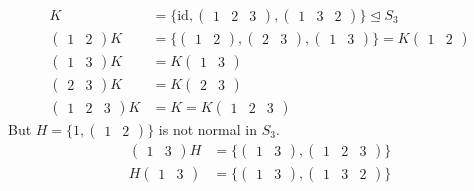 \begin{example} ~\vspace*{-1.5\baselineskip}
\begin{align*}
    K &= \{ \text{id}, \begin{pmatrix}1 & 2 & 3\end{pmatrix}, \begin{pmatrix}1 & 3 & 2\end{pmatrix} \} \trianglelefteq S_3 \\
    \begin{pmatrix}1 & 2\end{pmatrix} K &= \{ \begin{pmatrix}1 & 2\end{pmatrix}, \begin{pmatrix}2 & 3\end{pmatrix}, \begin{pmatrix}1 & 3\end{pmatrix} \} = K \begin{pmatrix}1 & 2\end{pmatrix} \\
    \begin{pmatrix}1 & 3\end{pmatrix} K &= K \begin{pmatrix}1 & 3\end{pmatrix} \\
    \begin{pmatrix}2 & 3\end{pmatrix} K &= K \begin{pmatrix}2 & 3\end{pmatrix} \\
    \begin{pmatrix}1 & 2 & 3\end{pmatrix} K &= K = K \begin{pmatrix}1 & 2 & 3\end{pmatrix}
\end{align*}
But $H = \{ 1, \begin{pmatrix}1 & 2\end{pmatrix} \}$ is not normal in $S_3$.
\begin{align*}
    \begin{pmatrix}1 & 3\end{pmatrix} H &= \{ \begin{pmatrix}1 & 3\end{pmatrix}, \begin{pmatrix}1 & 2 & 3\end{pmatrix} \} \\
    H \begin{pmatrix}1 & 3\end{pmatrix} &= \{ \begin{pmatrix}1 & 3\end{pmatrix}, \begin{pmatrix}1 & 3 & 2\end{pmatrix} \}
\end{align*}
\end{example}

